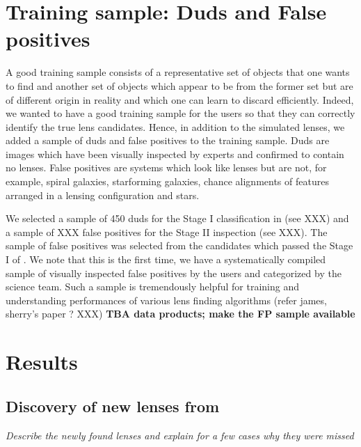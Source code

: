 \documentclass[useAMS,usenatbib,a4paper]{mn2e}
\begin{document}

\section{Training sample: Duds and False positives}
\label{sec:dfp}

A good training sample consists of a representative set of objects that
one wants to find and another set of objects which appear to be from the
former set but are of different origin in reality and which one can
learn to discard efficiently. Indeed, we wanted to have a good training
sample for the \sw users so that they can correctly identify the true
lens candidates. Hence, in addition to the simulated lenses, we
added a sample of duds and false positives to the training sample. Duds
are images which have been visually inspected by experts and confirmed
to contain no lenses.  False positives are systems which look like
lenses but are not, for example, spiral galaxies, starforming galaxies,
chance alignments of features arranged in a lensing configuration and
stars. 

We selected a sample of 450 duds for the Stage I classification in \sw
(see XXX) and a sample of XXX false positives for the Stage II
inspection (see XXX). The sample of false positives was selected from
the candidates which passed the Stage I of \sw. We note that this is the
first time, we have a systematically compiled sample of visually
inspected false positives by the \sw users and categorized by the
science team. Such a sample is tremendously helpful for training and
understanding performances of various lens finding algorithms (refer
james, sherry's paper ? XXX)
{\bf TBA data products; make the FP sample available}

\section{Results}
\label{sec:results}

\subsection{Discovery of new lenses from \sw}
\label{sec:results:disc}


{\it Describe the newly found lenses and explain for a few
cases why they were missed }
\end{document}
